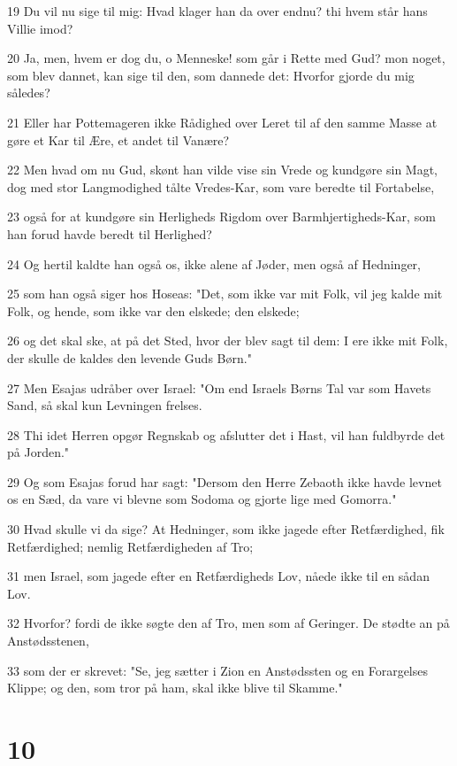 \par 19 Du vil nu sige til mig: Hvad klager han da over endnu? thi hvem står hans Villie imod?
\par 20 Ja, men, hvem er dog du, o Menneske! som går i Rette med Gud? mon noget, som blev dannet, kan sige til den, som dannede det: Hvorfor gjorde du mig således?
\par 21 Eller har Pottemageren ikke Rådighed over Leret til af den samme Masse at gøre et Kar til Ære, et andet til Vanære?
\par 22 Men hvad om nu Gud, skønt han vilde vise sin Vrede og kundgøre sin Magt, dog med stor Langmodighed tålte Vredes-Kar, som vare beredte til Fortabelse,
\par 23 også for at kundgøre sin Herligheds Rigdom over Barmhjertigheds-Kar, som han forud havde beredt til Herlighed?
\par 24 Og hertil kaldte han også os, ikke alene af Jøder, men også af Hedninger,
\par 25 som han også siger hos Hoseas: "Det, som ikke var mit Folk, vil jeg kalde mit Folk, og hende, som ikke var den elskede; den elskede;
\par 26 og det skal ske, at på det Sted, hvor der blev sagt til dem: I ere ikke mit Folk, der skulle de kaldes den levende Guds Børn."
\par 27 Men Esajas udråber over Israel: "Om end Israels Børns Tal var som Havets Sand, så skal kun Levningen frelses.
\par 28 Thi idet Herren opgør Regnskab og afslutter det i Hast, vil han fuldbyrde det på Jorden."
\par 29 Og som Esajas forud har sagt: "Dersom den Herre Zebaoth ikke havde levnet os en Sæd, da vare vi blevne som Sodoma og gjorte lige med Gomorra."
\par 30 Hvad skulle vi da sige? At Hedninger, som ikke jagede efter Retfærdighed, fik Retfærdighed; nemlig Retfærdigheden af Tro;
\par 31 men Israel, som jagede efter en Retfærdigheds Lov, nåede ikke til en sådan Lov.
\par 32 Hvorfor? fordi de ikke søgte den af Tro, men som af Geringer. De stødte an på Anstødsstenen,
\par 33 som der er skrevet: "Se, jeg sætter i Zion en Anstødssten og en Forargelses Klippe; og den, som tror på ham, skal ikke blive til Skamme."

\chapter{10}

